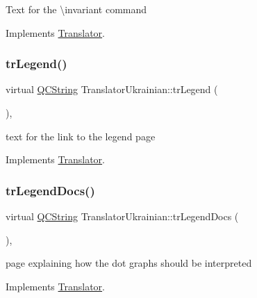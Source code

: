 Text for the \textbackslash{}invariant command 

Implements \mbox{\hyperlink{class_translator}{Translator}}.

\mbox{\label{class_translator_ukrainian_ace292f2140a37645d2e8c24d326f9326}} 
\subsubsection{\texorpdfstring{trLegend()}{trLegend()}}
{\footnotesize\ttfamily virtual \mbox{\hyperlink{class_q_c_string}{Q\+C\+String}} Translator\+Ukrainian\+::tr\+Legend (\begin{DoxyParamCaption}{ }\end{DoxyParamCaption})\hspace{0.3cm}{\ttfamily [inline]}, {\ttfamily [virtual]}}

text for the link to the legend page 

Implements \mbox{\hyperlink{class_translator}{Translator}}.

\mbox{\label{class_translator_ukrainian_acbe3f1963a8ca8165715964a8be20b77}} 
\subsubsection{\texorpdfstring{trLegendDocs()}{trLegendDocs()}}
{\footnotesize\ttfamily virtual \mbox{\hyperlink{class_q_c_string}{Q\+C\+String}} Translator\+Ukrainian\+::tr\+Legend\+Docs (\begin{DoxyParamCaption}{ }\end{DoxyParamCaption})\hspace{0.3cm}{\ttfamily [inline]}, {\ttfamily [virtual]}}

page explaining how the dot graph\textquotesingle{}s should be interpreted 

Implements \mbox{\hyperlink{class_translator}{Translator}}.

\mbox{\label{class_translator_ukrainian_ae15ea37c3bc242a78c37be8384c0f655}} 
